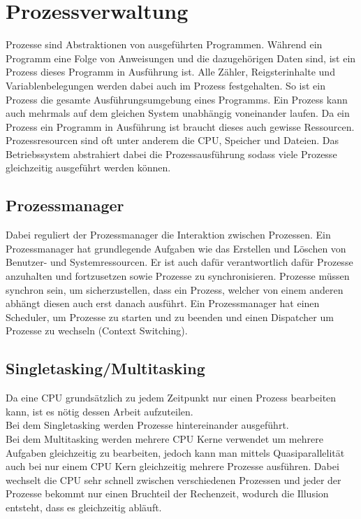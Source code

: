 \documentclass{article}
\begin{document}
	\section{Prozessverwaltung}
	Prozesse sind Abstraktionen von ausgeführten Programmen. Während ein Programm eine Folge von Anweisungen und die dazugehörigen Daten sind, ist ein Prozess dieses Programm in Ausführung ist. Alle Zähler, Reigsterinhalte und Variablenbelegungen werden dabei auch im Prozess festgehalten. So ist ein Prozess die gesamte Ausführungsumgebung eines Programms. Ein Prozess kann auch mehrmals auf dem gleichen System unabhängig voneinander laufen. Da ein Prozess ein Programm in Ausführung ist braucht dieses auch gewisse Ressourcen. Prozessresourcen sind oft unter anderem die CPU, Speicher und Dateien. Das Betriebssystem abstrahiert dabei die Prozessausführung sodass viele Prozesse gleichzeitig ausgeführt werden können. \\
	\subsection{Prozessmanager}
	Dabei reguliert der Prozessmanager die Interaktion zwischen Prozessen. Ein Prozessmanager hat grundlegende Aufgaben wie das Erstellen und Löschen von Benutzer- und Systemressourcen. Er ist auch dafür verantwortlich dafür Prozesse anzuhalten und fortzusetzen sowie Prozesse zu synchronisieren. Prozesse müssen synchron sein, um sicherzustellen, dass ein Prozess, welcher von einem anderen abhängt diesen auch erst danach ausführt. Ein Prozessmanager hat einen Scheduler, um Prozesse zu starten und zu beenden und einen Dispatcher um Prozesse zu wechseln (Context Switching).
	\subsection{Singletasking/Multitasking}
	Da eine CPU grundsätzlich zu jedem Zeitpunkt nur einen Prozess bearbeiten kann, ist es nötig dessen Arbeit aufzuteilen. \\
	Bei dem Singletasking werden Prozesse hintereinander ausgeführt. \\
	Bei dem Multitasking werden mehrere CPU Kerne verwendet um mehrere Aufgaben gleichzeitig zu bearbeiten, jedoch kann man mittels Quasiparallelität auch bei nur einem CPU Kern gleichzeitig mehrere Prozesse ausführen. Dabei wechselt die CPU sehr schnell zwischen verschiedenen Prozessen und jeder der Prozesse bekommt nur einen Bruchteil der Rechenzeit, wodurch die Illusion entsteht, dass es gleichzeitig abläuft. \\
\end{document}
